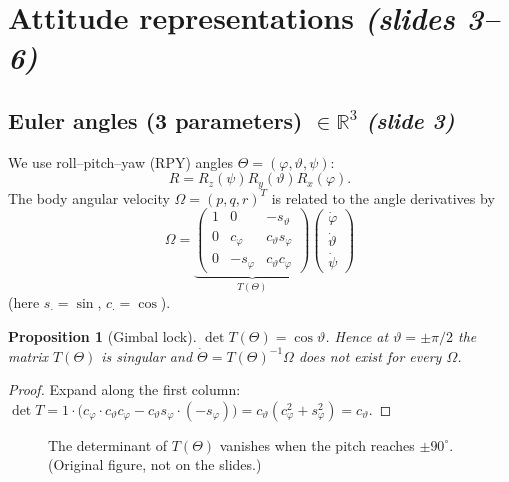 \documentclass[11pt,a4paper]{article}
\newcommand{\R}{\mathbb{R}}
\newcommand{\sli}[1]{\emph{(#1)}}
\theoremstyle{definition}
\theoremstyle{plain}
\newtheorem{proposition}[definition]{Proposition}
\theoremstyle{remark}
\begin{document}
\section{Attitude representations \sli{slides 3--6}}

\subsection{Euler angles (3 parameters) $\in\R^3$ \sli{slide 3}}

We use roll--pitch--yaw (RPY) angles $\Theta=(\varphi,\vartheta,\psi)$:
\[
R=R_z(\psi)R_y(\vartheta)R_x(\varphi).
\]
The body angular velocity $\Omega=(p,q,r)^T$ is related to the angle derivatives by
\[
\Omega=\underbrace{\begin{pmatrix}1&0&-s_\vartheta\\0&c_\varphi&c_\vartheta s_\varphi\\0&-s_\varphi&c_\vartheta c_\varphi\end{pmatrix}}_{T(\Theta)}\begin{pmatrix}\dot\varphi\\\dot\vartheta\\\dot\psi\end{pmatrix}
\]
(here $s_\cdot=\sin$, $c_\cdot=\cos$).

\begin{proposition}[Gimbal lock]
$\det T(\Theta)=\cos\vartheta$. Hence at $\vartheta=\pm\pi/2$ the matrix $T(\Theta)$ is singular and $\dot\Theta=T(\Theta)^{-1}\Omega$ does not exist for every $\Omega$.
\end{proposition}
\begin{proof}
Expand along the first column: $\det T=1\cdot\big(c_\varphi\cdot c_\vartheta c_\varphi-c_\vartheta s_\varphi\cdot(-s_\varphi)\big)=c_\vartheta(c_\varphi^2+s_\varphi^2)=c_\vartheta.$
\end{proof}

\begin{figure}[h]
\centering
{}
\caption{The determinant of $T(\Theta)$ vanishes when the pitch reaches $\pm 90^\circ$. (Original figure, not on the slides.)}
\end{figure}
\end{document}
